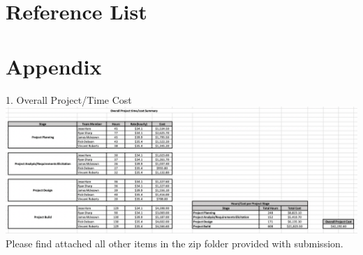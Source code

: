 \documentclass[11pt]{article}
\begin{document}
\section{Reference List}


\newpage


\section{Appendix}
1. Overall Project/Time Cost \\
\includegraphics[scale=0.35]{overall.png} \\

Please find attached all other items in the zip folder provided with submission.
\end{document}
